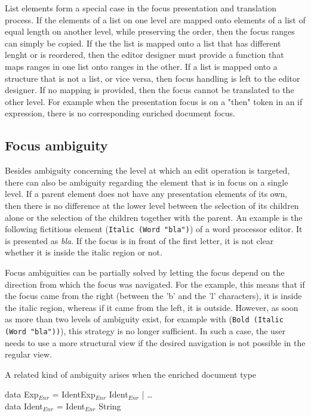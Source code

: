 List elements form a special case in the focus presentation and translation process. If the elements of a list on one level are mapped onto elements of a list of equal length on another level, while preserving the order, then the focus ranges can simply be copied. If the the list is mapped onto a list that has different lenght or is reordered, then the editor designer must provide a function that maps ranges in one list onto ranges in the other. If a list is mapped onto a structure that is not a list, or vice versa, then focus handling is left to the editor designer. If no mapping is provided, then the focus cannot be translated to the other level. For example when the presentation focus is on a "then" token in an if expression, there is no corresponding enriched document focus.
 
 
%									
\subsection{Focus ambiguity}

Besides ambiguity concerning the level at which an edit operation is targeted, there can also be  ambiguity regarding the element that is in focus on a single level. If a parent element does not have any presentation elements of its own, then there is no difference at the lower level between the selection of its children alone or the selection of the children together with the parent. An example is the following fictitious element (\verb|Italic (Word "bla")|) of a word processor editor. It is presented as {\it bla}. If the focus is in front of the first letter, it is not clear whether it is inside the italic region or not. 

Focus ambiguities can be partially solved by letting the focus depend on the direction from which the focus was navigated. For the example, this means that if the focus came from the right (between the 'b' and the 'l' characters), it is inside the italic region, whereas if it came from the left, it is outside. However, as soon as more than two levels of ambiguity exist, for example with (\verb|Bold (Italic (Word "bla"))|), this strategy is no longer sufficient. In such a case, the user needs to use a more structural view if the desired navigation is not possible in the regular view.


A related kind of ambiguity arises when the enriched document type

\small \ttfamily
\begin{tabbing}
data Exp$_{Enr}$ = IdentExp$_{Enr}$ Ident$_{Enr}$ | \dots \\
data Ident$_{Enr}$ = Ident$_{Enr}$ String
\end{tabbing}
\rmfamily \normalsize

